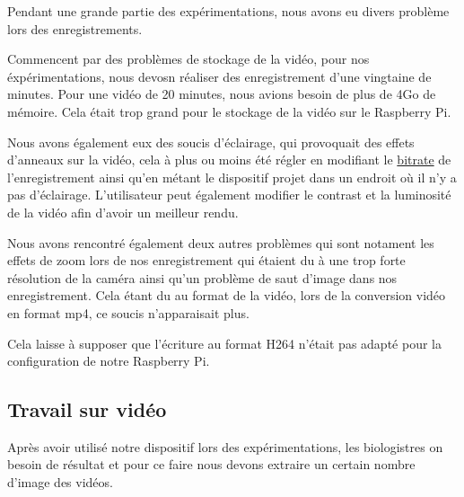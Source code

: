         \begin{flushleft}
            Pendant une grande partie des expérimentations, nous avons eu divers problème lors des enregistrements.

            \vspace{0.2cm}
    
            Commencent par des problèmes de stockage de la vidéo, pour nos éxpérimentations, nous devosn réaliser des enregistrement d'une vingtaine de minutes.
            Pour une vidéo de 20 minutes, nous avions besoin de plus de 4Go de mémoire.
            Cela était trop grand pour le stockage de la vidéo sur le Raspberry Pi.
    
            \vspace{0.2cm}
    
            Nous avons également eux des soucis d'éclairage, qui provoquait des effets d'anneaux sur la vidéo, cela à plus ou moins été régler en modifiant le \underline{bitrate} de l'enregistrement ainsi qu'en métant le dispositif projet dans un endroit où il n'y a pas d'éclairage.
            L'utilisateur peut également modifier le contrast et la luminosité de la vidéo afin d'avoir un meilleur rendu.
    
            \vspace{0.2cm}
    
            Nous avons rencontré également deux autres problèmes qui sont notament les effets de zoom lors de nos enregistrement qui étaient du à une trop forte résolution de la caméra ainsi qu'un problème de saut d'image dans nos enregistrement. Cela étant du au format de la vidéo, lors de la conversion vidéo en format mp4, ce soucis n'apparaisait plus.
    
            \vspace{0.2cm}
    
            Cela laisse à supposer que l'écriture au format H264 n'était pas adapté pour la configuration de notre Raspberry Pi.
    
            \subsection{Travail sur vidéo}
            Après avoir utilisé notre dispositif lors des expérimentations, les biologistres on besoin de résultat et pour ce faire nous devons extraire un certain nombre d'image des vidéos.
    
            \vspace{0.2cm}


\end{flushleft}
